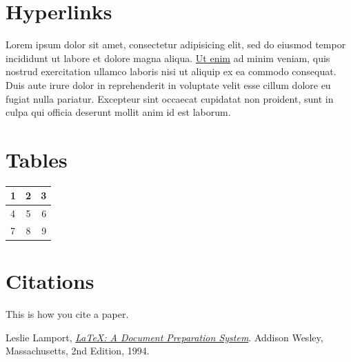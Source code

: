 \documentclass[10pt]{article}
\begin{document}
\section{Hyperlinks}
Lorem ipsum dolor sit amet, consectetur adipisicing elit, sed do eiusmod
tempor incididunt ut labore et dolore magna aliqua. \href{http://www.google.com}{Ut enim}
 ad minim veniam,
quis nostrud exercitation ullamco laboris nisi ut aliquip ex ea commodo
consequat. Duis aute irure dolor in reprehenderit in voluptate velit esse
cillum dolore eu fugiat nulla pariatur. Excepteur sint occaecat cupidatat non
proident, sunt in culpa qui officia deserunt mollit anim id est laborum.

\section{Tables}

\begin{tabular}{ l | c | r }
  \hline
  1 & 2 & 3 \\ \hline
  4 & 5 & 6 \\ \hline
  7 & 8 & 9 \\ \hline
\end{tabular}


%
% 


% 
% 
\section{Citations}

This is how you cite \cite{lamport94} a paper.

\begin{thebibliography}{9}

  Leslie Lamport,
  \href{http://www.google.com}{\emph{\LaTeX: A Document Preparation System}}.
  Addison Wesley, Massachusetts,
  2nd Edition,
  1994.


\end{thebibliography}
\end{document}
